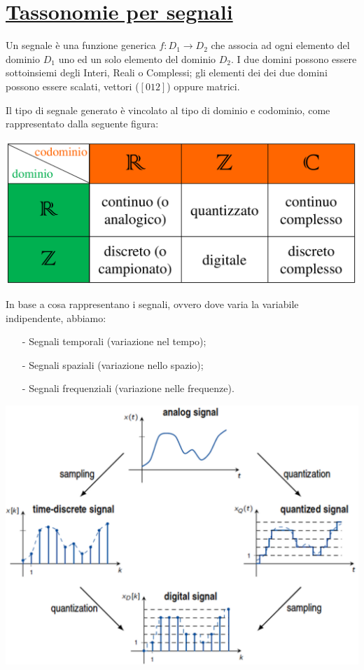 \documentclass[a4paper, 10pt]{report}
\begin{document}
\section*{\underline{Tassonomie per segnali}}

Un segnale è una funzione generica $f: D_1 \rightarrow D_2$ che associa ad ogni elemento del dominio $D_1$ uno ed un solo elemento del dominio $D_2$. I due domini possono essere sottoinsiemi degli Interi, Reali o Complessi; gli elementi dei dei due domini possono essere scalati, vettori ($[0 1 2]$) oppure matrici. 

Il tipo di segnale generato è vincolato al tipo di dominio e codominio, come rappresentato dalla seguente figura:

\begin{center}
\includegraphics[scale=0.3]{24_cropped.pdf}
\end{center}

\noindent In base a cosa rappresentano i segnali, ovvero dove varia la variabile indipendente, abbiamo:
\begin{itemize}
\item[-] Segnali temporali (variazione nel tempo);
\item[-] Segnali spaziali (variazione nello spazio);
\item[-] Segnali frequenziali (variazione nelle frequenze).
\end{itemize}

\begin{center}
\includegraphics[scale=0.4]{25_cropped.pdf}
\end{center}
\end{document}
